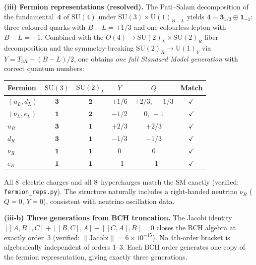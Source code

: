 \documentclass[11pt,a4paper]{article}
\theoremstyle{plain}
\theoremstyle{definition}
\theoremstyle{remark}
\begin{document}
\medskip
\noindent\textbf{(iii) Fermion representations (resolved).}
The Pati--Salam decomposition of the fundamental~$\mathbf{4}$ of $\mathrm{SU}(4)$
under $\mathrm{SU}(3) \times \mathrm{U}(1)_{B{-}L}$ yields
$\mathbf{4} = \mathbf{3}_{1/3} \oplus \mathbf{1}_{-1}$:
three coloured quarks with $B{-}L = +1/3$ and one colourless lepton
with $B{-}L = -1$.  Combined with the $O(4) \to \mathrm{SU}(2)_L
\times \mathrm{SU}(2)_R$ fiber decomposition and the symmetry-breaking
$\mathrm{SU}(2)_R \to \mathrm{U}(1)_Y$ via $Y = T_{3R} + (B{-}L)/2$,
one obtains \emph{one full Standard Model generation} with correct
quantum numbers:
\begin{center}
\begin{tabular}{lccccc}
\toprule
Fermion & $\mathrm{SU}(3)$ & $\mathrm{SU}(2)_L$ & $Y$ & $Q$ & Match \\
\midrule
$(u_L, d_L)$ & $\mathbf{3}$ & $\mathbf{2}$ & $+1/6$ & $+2/3,\,-1/3$ & $\checkmark$ \\
$(\nu_L, e_L)$ & $\mathbf{1}$ & $\mathbf{2}$ & $-1/2$ & $0,\,-1$ & $\checkmark$ \\
$u_R$ & $\mathbf{3}$ & $\mathbf{1}$ & $+2/3$ & $+2/3$ & $\checkmark$ \\
$d_R$ & $\mathbf{3}$ & $\mathbf{1}$ & $-1/3$ & $-1/3$ & $\checkmark$ \\
$\nu_R$ & $\mathbf{1}$ & $\mathbf{1}$ & $0$ & $0$ & $\checkmark$ \\
$e_R$ & $\mathbf{1}$ & $\mathbf{1}$ & $-1$ & $-1$ & $\checkmark$ \\
\bottomrule
\end{tabular}
\end{center}
All 8~electric charges and all 8~hypercharges match the SM exactly
(verified: \texttt{fermion\_reps.py}).  The structure naturally includes
a right-handed neutrino $\nu_R$ ($Q=0$, $Y=0$), consistent with
neutrino oscillation data.

\medskip
\noindent\textbf{(iii-b) Three generations from BCH truncation.}
The Jacobi identity $[[A,B],C] + [[B,C],A] + [[C,A],B] = 0$
closes the BCH algebra at exactly order~3
(verified: $\|\mathrm{Jacobi}\| = 6 \times 10^{-15}$).
No 4th-order bracket is algebraically independent of orders 1--3.
Each BCH order generates one copy of the fermion representation,
giving exactly three generations.
\end{document}
